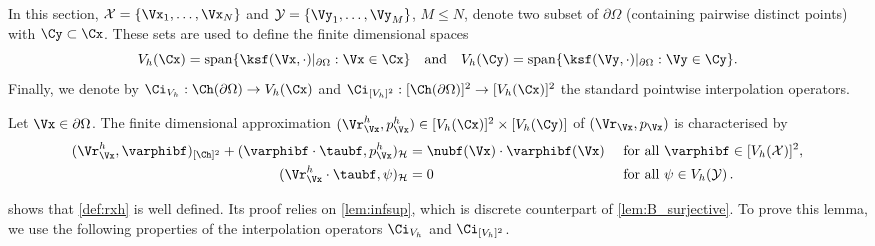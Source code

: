 \documentclass{siamart1116}
\numberwithin{theorem}{section}
\begin{document}
In this section, $\mathcal X = \{\Vx_1,\ldots, \Vx_N\}$ and $\mathcal Y = \{\Vy_1,\ldots, \Vy_M\} $, $M\le N$,  
denote two subset of $\partial \Omega$ (containing pairwise distinct points) with $\Cy \subset\Cx$.
These sets are used to define the finite dimensional spaces
\begin{equation}\label{eq:V_h}
V_h(\Cx) = \mathrm{span}\{\ksf(\Vx, \cdot)|_{\partial \Omega}: \Vx\in \Cx\}
\quad \text{and} \quad V_h(\Cy) = \mathrm{span}\{\ksf(\Vy, \cdot)|_{\partial \Omega}: \Vy\in \Cy\}.
\end{equation}
Finally, we denote by $\Ci_{V_h}:\Ch(\partial \Omega) \to V_h(\Cx)$ and
$\Ci_{[V_h]^2}:[\Ch(\partial \Omega)]^2 \to [V_h(\Cx)]^2$ the standard pointwise interpolation operators.

\begin{definition}\label{def:rxh}
Let $\Vx\in \partial \Omega$. The finite dimensional approximation
$(\Vr_\Vx^h,p_\Vx^h)\in[V_h(\Cx)]^2\times [V_h(\Cy)]$ of $(\Vr_\Vx, p_\Vx)$ is characterised by
\begin{subequations}
\label{eq:saddlepointdiscr}
\begin{align}
(\Vr_\Vx^h,\varphibf)_{[\Ch]^2}  +(\varphibf \cdot \taubf, p_\Vx^h )_{\mathcal  H}
&= \nubf(\Vx)\cdot \varphibf(\Vx)&& \text{ for all } \varphibf \in [V_h(\mathcal X)]^2,\label{eq:1RKHSh2}\\
\;(\Vr_\Vx^h\cdot \taubf, \psi)_{\mathcal H}
& =0 &&\text{ for all } \psi \in V_h(\mathcal Y) \label{eq:2RKHSh2}\,.
\end{align}
\end{subequations}
\end{definition}

 shows that \cref{def:rxh} is well defined.
Its proof relies on \cref{lem:infsup},
which is discrete counterpart of \cref{lem:B_surjective}.
To prove this lemma, we use the following properties of the interpolation operators
$\Ci_{V_h}$ and $\Ci_{[V_h]^2}$.
\end{document}
